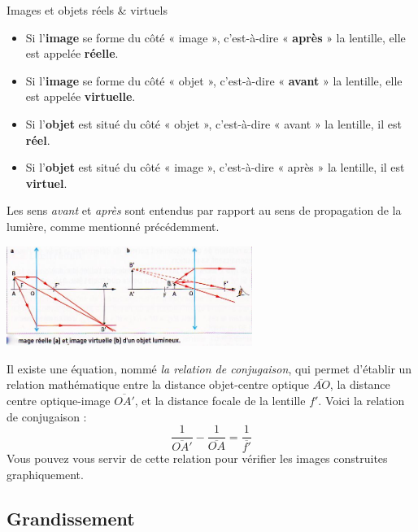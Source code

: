 \documentclass[11pt,a4paper]{article}
\begin{document}
\begin{defn}{Images et objets réels \& virtuels}

\begin{itemize}
    \item Si l’\textbf{image} se forme du côté « image », c’est-à-dire « \textbf{après} » la lentille, elle est appelée \textbf{réelle}. 
    \item Si l’\textbf{image} se forme du côté « objet », c’est-à-dire « \textbf{avant} » la lentille, elle est appelée \textbf{virtuelle}. 
    \item Si l’\textbf{objet} est situé du côté « objet », c’est-à-dire « avant » la lentille, il est \textbf{réel}. 
    \item Si l’\textbf{objet} est situé du côté « image », c’est-à-dire « après » la lentille, il est \textbf{virtuel}. 
\end{itemize}
Les sens \textit{avant} et \textit{après} sont entendus par rapport au sens de propagation de la lumière, comme mentionné précédemment. 
\end{defn}

\begin{eg}
\begin{center}
    \includegraphics[width=0.6\textwidth]{imgs/p6/imagesvirtuelle.jpg}
\end{center}
\end{eg}

\begin{rmrq}
Il existe une équation, nommé \emph{la relation de conjugaison}, qui permet d'établir un relation mathématique entre la distance objet-centre optique $\overline{AO}$, la distance centre optique-image $\overline{OA'}$, et la distance focale de la lentille $f'$. Voici la relation de conjugaison : 
\[ \dfrac{1}{\overline{OA'}} - \dfrac{1}{\overline{OA}} = \dfrac{1}{\overline{f'}}\]
Vous pouvez vous servir de cette relation pour vérifier les images construites graphiquement. 
\end{rmrq}

\subsection{Grandissement}
\end{document}
